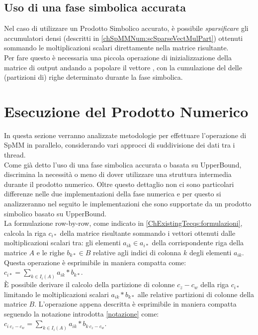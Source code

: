 \subsection{Uso di una fase simbolica accurata}
Nel caso di utilizzare un Prodotto Simbolico accurato, è possibile \emph{sparsificare}
gli accumulatori densi (descritti in \ref{chSpMMNum:scSparseVectMulPart}) ottenuti sommando le moltiplicazioni scalari
direttamente nella matrice risultante.\\
Per fare questo è necessaria una piccola operazione di inizializzazione della matrice di output
andando a popolare il vettore , con la cumulazione del \nnnz delle 
(partizioni di) righe determinato durante la fase simbolica.\\

\section{Esecuzione del Prodotto Numerico}
In questa sezione verranno analizzate metodologie per effettuare l'operazione di SpMM in parallelo,
considerando vari approcci di suddivisione dei dati tra i thread.\\
Come già detto l'uso di una fase simbolica accurata o basata su UpperBound, discrimina la necessità 
o meno di dover utilizzare una struttura intermedia durante il prodotto numerico.
Oltre questo dettaglio non ci sono particolari differenze nelle due implementazioni della fase numerica
e per questo si analizzeranno nel seguito le implementazioni che sono supportate da un prodotto simbolico basato su UpperBound.\\
La formulazione row-by-row, come indicato in \ref{ChExistingTecqs:formulazioni}, 
calcola la riga $c_{i*}$ della matrice risultante sommando i vettori ottenuti dalle moltiplicazioni scalari tra:
gli elementi $a_{ik} \in a_{i*}$ della corrispondente riga della matrice $A$ e  
le righe $b_{k*} \in B$ relative agli indici di colonna $k$ degli elementi $a_{ik}$.
Questa operazione è esprimibile in maniera compatta come:
$c_{i*} = \sum\limits_{k \in I_i(A)}  a_{ik} \ast  b_{k*}$.\\
È possibile derivare il calcolo della partizione di colonne $c_z - c_w$ della riga $c_{i*}$
limitando le moltiplicazioni scalari $a_{ik} \ast  b_{k*}$ alle relative partizioni di colonne della matrice $B$. 
L'operazione appena descritta è esprimibile in maniera compatta seguendo la notazione introdotta \ref{notazione} come:\\
$c_{i~c_z-c_w} = \sum\limits_{k \in I_i(A)}  a_{ik} \ast  b_{k~c_z-c_w}$.\\

